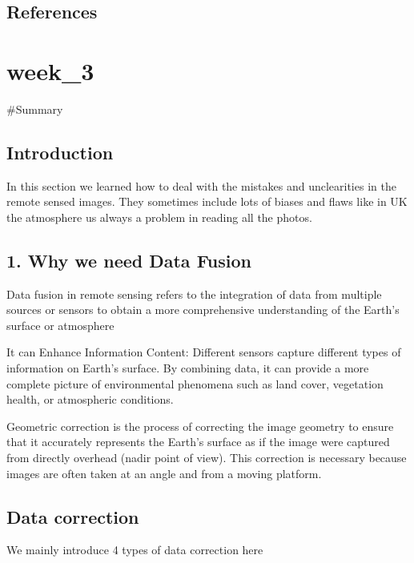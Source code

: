 \documentclass[
  letterpaper,
  DIV=11,
  numbers=noendperiod]{scrreprt}
\begin{document}
\section{\texorpdfstring{\textbf{References}}{References}}\label{references}


\chapter{week\_3}\label{week_3}

\#Summary

\section{Introduction}\label{introduction-1}

In this section we learned how to deal with the mistakes and
unclearities in the remote sensed images. They sometimes include lots of
biases and flaws like in UK the atmosphere us always a problem in
reading all the photos.

\section{1. Why we need Data Fusion}\label{why-we-need-data-fusion}

Data fusion in remote sensing refers to the integration of data from
multiple sources or sensors to obtain a more comprehensive understanding
of the Earth's surface or atmosphere

It can Enhance Information Content: Different sensors capture different
types of information on Earth's surface. By combining data, it can
provide a more complete picture of environmental phenomena such as land
cover, vegetation health, or atmospheric conditions.

Geometric correction is the process of correcting the image geometry to
ensure that it accurately represents the Earth's surface as if the image
were captured from directly overhead (nadir point of view). This
correction is necessary because images are often taken at an angle and
from a moving platform.

\section{Data correction}\label{data-correction}

We mainly introduce 4 types of data correction here
\end{document}
